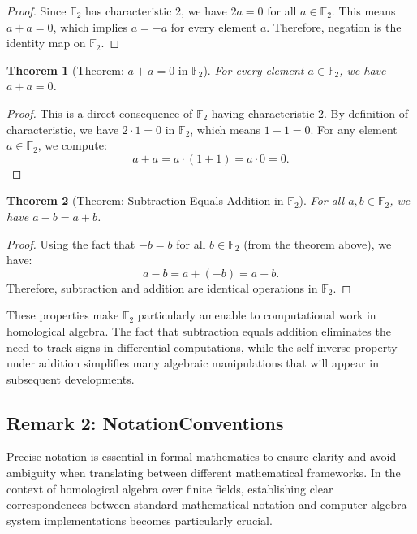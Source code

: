\documentclass[11pt]{article}
\theoremstyle{plain}
\newtheorem*{theorem}{Theorem}
\theoremstyle{definition}
\theoremstyle{remark}
\begin{document}
\begin{proof}
Since $\mathbb{F}_2$ has characteristic $2$, we have $2a = 0$ for all $a \in \mathbb{F}_2$. This means $a + a = 0$, which implies $a = -a$ for every element $a$. Therefore, negation is the identity map on $\mathbb{F}_2$.
\end{proof}

\begin{theorem}[Theorem: $a + a = 0$ in $\mathbb{F}_2$]
For every element $a \in \mathbb{F}_2$, we have $a + a = 0$.
\end{theorem}

\begin{proof}
This is a direct consequence of $\mathbb{F}_2$ having characteristic $2$. By definition of characteristic, we have $2 \cdot 1 = 0$ in $\mathbb{F}_2$, which means $1 + 1 = 0$. For any element $a \in \mathbb{F}_2$, we compute:
\[
a + a = a \cdot (1 + 1) = a \cdot 0 = 0.
\]
\end{proof}

\begin{theorem}[Theorem: Subtraction Equals Addition in $\mathbb{F}_2$]
For all $a, b \in \mathbb{F}_2$, we have $a - b = a + b$.
\end{theorem}

\begin{proof}
Using the fact that $-b = b$ for all $b \in \mathbb{F}_2$ (from the theorem above), we have:
\[
a - b = a + (-b) = a + b.
\]
Therefore, subtraction and addition are identical operations in $\mathbb{F}_2$.
\end{proof}

These properties make $\mathbb{F}_2$ particularly amenable to computational work in homological algebra. The fact that subtraction equals addition eliminates the need to track signs in differential computations, while the self-inverse property under addition simplifies many algebraic manipulations that will appear in subsequent developments.

\vspace{1em}

\subsection{Remark 2: NotationConventions}

Precise notation is essential in formal mathematics to ensure clarity and avoid ambiguity when translating between different mathematical frameworks. In the context of homological algebra over finite fields, establishing clear correspondences between standard mathematical notation and computer algebra system implementations becomes particularly crucial.
\end{document}
